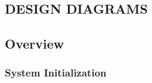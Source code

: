 \documentclass[12pt,a4paper]{article}
\begin{document}
\newpage
\begin{center}
\section{DESIGN DIAGRAMS}
\end{center}
\pagestyle{plain}
\subsection{Overview}
\subsubsection{System Initialization} 
\end{document}
